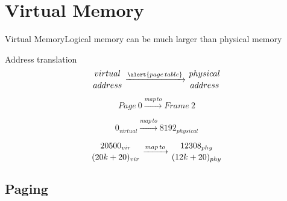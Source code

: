 \section{Virtual Memory}

\begin{frame}{Virtual Memory}{Logical memory can be much larger than physical memory}
  \begin{varwidth}{.48\textwidth}
    \begin{center}
    \end{center}
  \end{varwidth}\hfill
  \begin{varwidth}{.48\textwidth}
    \begin{iblock}{Address translation}
      $$\genfrac{}{}{0pt}{}{virtual}{address}
      \xrightarrow{\alert{page\,table}}
      \genfrac{}{}{0pt}{}{physical}{address}$$
      
      $$Page\ 0\xrightarrow{map\,to}Frame\ 2$$
      
      $$0_{virtual}\xrightarrow{map\,to}8192_{physical}$$
      
      $$\genfrac{}{}{0pt}{}{20500_{vir}}{(20k+20)_{vir}}
      \xrightarrow{map\,to} \genfrac{}{}{0pt}{}{12308_{phy}}{(12k+20)_{phy}}$$
    \end{iblock}
  \end{varwidth}
\end{frame}


\subsection{Paging}

